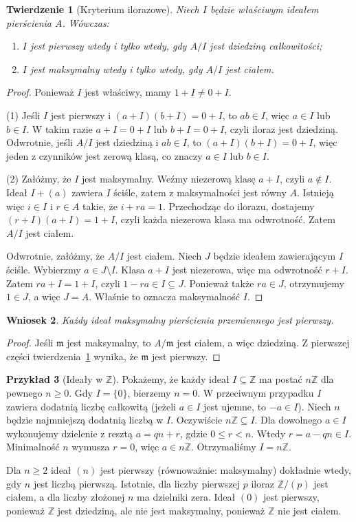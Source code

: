 \documentclass[11pt,a4paper,openany]{report}
\numberwithin{equation}{section}
\theoremstyle{plain}
\newtheorem{twierdzenie}{Twierdzenie}[section]
\newtheorem{wniosek}[twierdzenie]{Wniosek}
\theoremstyle{definition}
\newtheorem{przyklad}[twierdzenie]{Przykład}
\theoremstyle{remark}
\newcommand{\Z}{\mathbb Z}
\begin{document}
\begin{twierdzenie}[Kryterium ilorazowe]
\label{tw:kryterium}
Niech $I$ będzie właściwym ideałem pierścienia $A$.
Wówczas:
\begin{enumerate}[label=\arabic*)]
\item $I$ jest pierwszy wtedy i tylko wtedy, gdy $A/I$ jest dziedziną całkowitości;
\item $I$ jest maksymalny wtedy i tylko wtedy, gdy $A/I$ jest ciałem.
\end{enumerate}
\end{twierdzenie}
\begin{proof}
Ponieważ $I$ jest właściwy, mamy $1+I\ne0+I$.

(1) Jeśli $I$ jest pierwszy i $(a+I)(b+I)=0+I$,
to $ab\in I$, więc $a\in I$ lub $b\in I$.
W takim razie $a+I=0+I$ lub $b+I=0+I$, czyli iloraz jest dziedziną.
Odwrotnie, jeśli $A/I$ jest dziedziną i $ab\in I$, to
$(a+I)(b+I)=0+I$, więc jeden z czynników jest zerową klasą,
co znaczy $a\in I$ lub $b\in I$.

(2) Załóżmy, że $I$ jest maksymalny. Weźmy niezerową klasę $a+I$,
czyli $a\notin I$. Ideał $I+(a)$ zawiera $I$ ściśle,
zatem z maksymalności jest równy $A$.
Istnieją więc $i\in I$ i $r\in A$ takie, że $i+ra=1$.
Przechodząc do ilorazu, dostajemy
$(r+I)(a+I)=1+I$, czyli każda niezerowa klasa ma odwrotność.
Zatem $A/I$ jest ciałem.

Odwrotnie, załóżmy, że $A/I$ jest ciałem.
Niech $J$ będzie ideałem zawierającym $I$ ściśle.
Wybierzmy $a\in J\setminus I$. Klasa $a+I$ jest niezerowa,
więc ma odwrotność $r+I$. Zatem $ra+I=1+I$, czyli $1-ra\in I\subseteq J$.
Ponieważ także $ra\in J$, otrzymujemy $1\in J$, a więc $J=A$.
Właśnie to oznacza maksymalność $I$.
\end{proof}

\begin{wniosek}
Każdy ideał maksymalny pierścienia przemiennego jest pierwszy.
\end{wniosek}
\begin{proof}
Jeśli $\mathfrak m$ jest maksymalny, to $A/\mathfrak m$ jest ciałem,
a więc dziedziną. Z pierwszej części twierdzenia~\ref{tw:kryterium}
wynika, że $\mathfrak m$ jest pierwszy.
\end{proof}

\begin{przyklad}[Ideały w $\Z$]
Pokażemy, że każdy ideał $I\subseteq\Z$ ma postać $n\Z$ dla pewnego
$n\ge0$. Gdy $I=\{0\}$, bierzemy $n=0$.
W przeciwnym przypadku $I$ zawiera dodatnią liczbę całkowitą
(jeżeli $a\in I$ jest ujemne, to $-a\in I$). Niech $n$ będzie
najmniejszą dodatnią liczbą w $I$.
Oczywiście $n\Z\subseteq I$. Dla dowolnego $a\in I$ wykonujemy
dzielenie z resztą $a=qn+r$, gdzie $0\le r<n$.
Wtedy $r=a-qn\in I$. Minimalność $n$ wymusza $r=0$,
więc $a\in n\Z$. Otrzymaliśmy $I=n\Z$.

Dla $n\ge2$ ideał $(n)$ jest pierwszy (równoważnie: maksymalny)
dokładnie wtedy, gdy $n$ jest liczbą pierwszą.
Istotnie, dla liczby pierwszej $p$ iloraz $\Z/(p)$ jest ciałem,
a dla liczby złożonej $n$ ma dzielniki zera.
Ideał $(0)$ jest pierwszy, ponieważ $\Z$ jest dziedziną,
ale nie jest maksymalny, ponieważ $\Z$ nie jest ciałem.
\end{przyklad}
\end{document}
